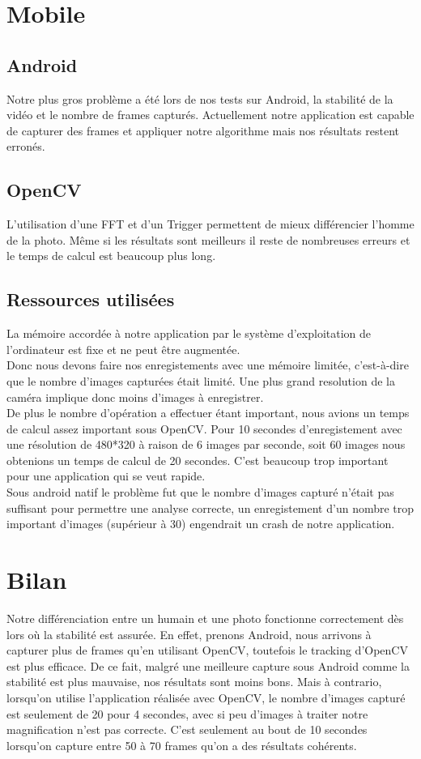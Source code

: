 \section{Mobile}

\subsection{Android}

Notre plus gros problème a été lors de nos tests sur Android, la stabilité de la vidéo et le nombre de frames capturés.
Actuellement notre application est capable de capturer des frames et appliquer notre algorithme mais nos résultats restent erronés.

\subsection{OpenCV}
L'utilisation d'une FFT et d'un Trigger permettent de mieux différencier l'homme de la photo. Même si les résultats sont meilleurs il reste de nombreuses erreurs et le temps de calcul est beaucoup plus long.

\subsection{Ressources utilisées}
La mémoire accordée à notre application par le système d'exploitation de l'ordinateur est fixe et ne peut être augmentée.\\
Donc nous devons faire nos enregistements avec une mémoire limitée, c'est-à-dire que le nombre d'images capturées était limité. Une plus grand resolution de la caméra implique donc moins d'images à enregistrer. \\
De plus le nombre d'opération a effectuer étant important, nous avions un temps de calcul assez important sous OpenCV\@. Pour 10 secondes d'enregistement avec une résolution de 480*320 à raison de 6 images par seconde, soit 60 images nous obtenions un temps de calcul de 20 secondes. C'est beaucoup trop important pour une application qui se veut rapide.\\
Sous android natif le problème fut que le nombre d'images capturé n'était pas suffisant pour permettre une analyse correcte, un enregistement d'un nombre trop important d'images (supérieur à 30) engendrait un crash de notre application.

\section{Bilan}

Notre différenciation entre un humain et une photo fonctionne correctement dès lors où la stabilité est assurée. En effet, prenons Android, nous arrivons
à capturer plus de frames qu'en utilisant OpenCV, toutefois le tracking d'OpenCV est plus efficace. De ce fait, malgré une meilleure capture sous Android
comme la stabilité est plus mauvaise, nos résultats sont moins bons. Mais à contrario, lorsqu'on utilise l'application réalisée avec OpenCV, le nombre d'images
capturé est seulement de 20 pour 4 secondes, avec si peu d'images à traiter notre magnification n'est pas correcte. C'est seulement au bout de 10 secondes
lorsqu'on capture entre 50 à 70 frames qu'on a des résultats cohérents.
